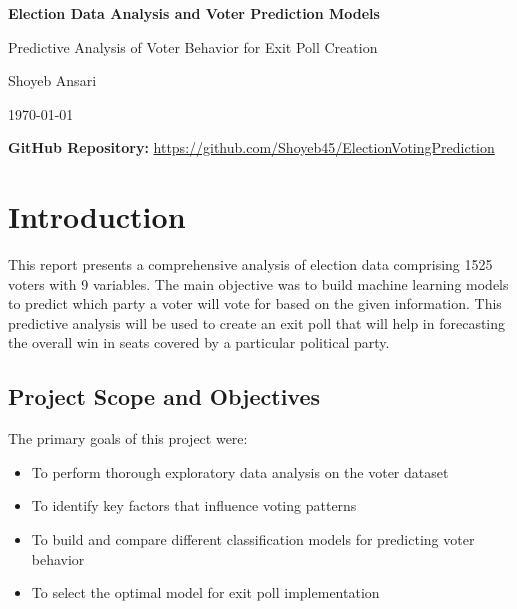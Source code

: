 \documentclass[12pt]{article}
\begin{document}
\begin{titlepage}
    \centering
    \vspace*{2cm}
    {\LARGE\bfseries Election Data Analysis and Voter Prediction Models\par}
    \vspace{2cm}
    {\Large Predictive Analysis of Voter Behavior for Exit Poll Creation\par}
    \vspace{3cm}
    {\Large Shoyeb Ansari\par}
    \vspace{1cm}
    {\large\today\par}
    \vfill
    {\large\textbf{GitHub Repository:} \url{https://github.com/Shoyeb45/ElectionVotingPrediction}\par}
\end{titlepage}

\thispagestyle{empty}
\tableofcontents
\pagebreak

\listoffigures
\pagebreak

\listoftables
\pagebreak

\section{Introduction}
This report presents a comprehensive analysis of election data comprising 1525 voters with 9 variables. The main objective was to build machine learning models to predict which party a voter will vote for based on the given information. This predictive analysis will be used to create an exit poll that will help in forecasting the overall win in seats covered by a particular political party.

\subsection{Project Scope and Objectives}
The primary goals of this project were:
\begin{itemize}
    \item To perform thorough exploratory data analysis on the voter dataset
    \item To identify key factors that influence voting patterns
    \item To build and compare different classification models for predicting voter behavior
    \item To select the optimal model for exit poll implementation
\end{itemize}
\end{document}
